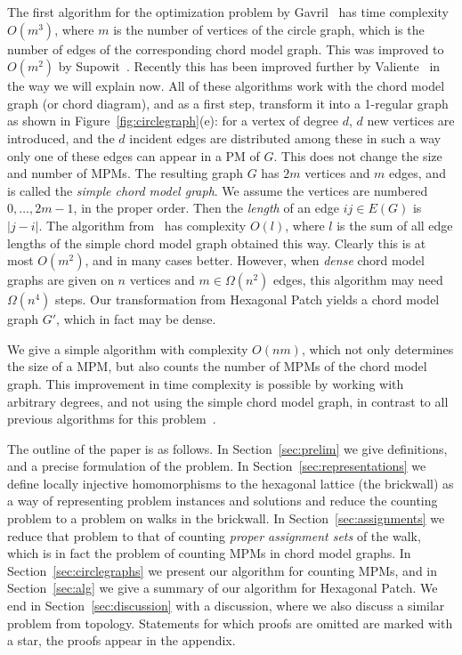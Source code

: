 \documentclass{llncs}
\begin{document}
The first algorithm for the optimization problem by Gavril~\cite{Gav73} has time complexity $O(m^3)$, where $m$ is the number of vertices of the circle graph, which is the number of edges of the corresponding chord model graph.
This was improved to $O(m^2)$ by Supowit~\cite{Sup87}. Recently this has been improved further by Valiente~\cite{Val03} in the way we will explain now. 
All of these algorithms work with the chord model graph (or chord diagram), and as a first step, transform it into a 1-regular graph as shown in Figure~\ref{fig:circlegraph}(e):
for a vertex of degree $d$, $d$ new vertices are introduced, and the $d$ incident edges are distributed among these in such a way only one of these edges can appear in a PM of $G$. This does not change the size and number of MPMs. The resulting graph $G$ has $2m$ vertices and $m$ edges, and is called the {\em simple chord model graph}. We assume the vertices are numbered $0,\ldots,2m-1$, in the proper order. Then the {\em length} of an edge $ij\in E(G)$ is $|j-i|$. The algorithm from~\cite{Val03} has complexity $O(l)$, where $l$ is the sum of all edge lengths of the simple chord model graph obtained this way. Clearly this is at most $O(m^2)$, and in many cases better. However, when {\em dense} chord model graphs are given on $n$ vertices and $m\in \Omega(n^2)$ edges, this algorithm may need $\Omega(n^4)$ steps. 
Our transformation from Hexagonal Patch yields a chord model graph $G'$, which in fact may be dense.

We give a simple algorithm with complexity $O(nm)$, which not only determines the size of a MPM, but also counts the number of MPMs of the chord model graph. 
This improvement in time complexity is possible by working with arbitrary degrees, and not using the simple chord model graph, in contrast to all previous algorithms for this problem~\cite{Val03}.







The outline of the paper is as follows. In Section~\ref{sec:prelim} we give definitions, and a precise formulation of the problem. In Section~\ref{sec:representations} we define locally injective homomorphisms to the hexagonal lattice (the brickwall) as a way of representing problem instances and solutions and reduce the counting problem to a problem on walks in the brickwall. 
In Section~\ref{sec:assignments} we reduce that problem to that of counting {\em proper assignment sets} of the walk, which is in fact the problem of counting MPMs in chord model graphs.
In Section~\ref{sec:circlegraphs} we present our algorithm for counting MPMs, and in Section~\ref{sec:alg} we give a summary of our algorithm for Hexagonal Patch.
We end in Section~\ref{sec:discussion} with a discussion, where we also discuss a similar problem from topology.
Statements for which proofs are omitted are marked with a star, the proofs appear in the appendix.
\end{document}
